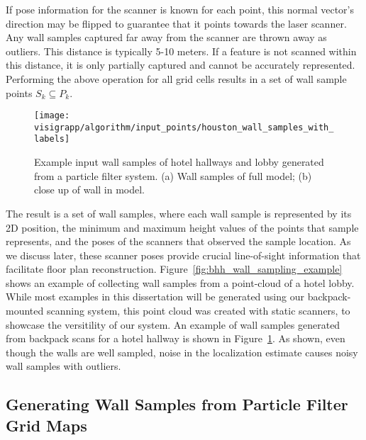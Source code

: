 \documentclass[12pt,onecolumn,oneside]{book}
\begin{document}
If pose information for the scanner is known for each point, this normal vector's direction may be flipped to guarantee that it points towards the laser scanner.  Any wall samples captured far away from the scanner are thrown away as outliers.  This distance is typically 5-10 meters.  If a feature is not scanned within this distance, it is only partially captured and cannot be accurately represented. Performing the above operation for all grid cells results in a set of wall sample points $S_k \subseteq P_k$.  

\begin{figure}
  \centering
  \texttt{[image: visigrapp/algorithm/input\_points/houston\_wall\_samples\_with\_labels]}
  \caption[Wall samples from backpack point cloud.]{Example input wall samples of hotel hallways and lobby generated from a particle filter system. (a) Wall samples of full model; (b) close up of wall in model.}
  \label{fig:backpack_wall_sample_example}
\end{figure}

The result is a set of wall samples, where each wall sample is represented by its 2D position, the minimum and maximum height values of the points that sample represents, and the poses of the scanners that observed the sample location.  As we discuss later, these scanner poses provide crucial line-of-sight information that facilitate floor plan reconstruction.  Figure~\ref{fig:bhh_wall_sampling_example} shows an example of collecting wall samples from a point-cloud of a hotel lobby.  While most examples in this dissertation will be generated using our backpack-mounted scanning system, this point cloud was created with static scanners, to showcase the versitility of our system. An example of wall samples generated from backpack scans for a hotel hallway is shown in Figure~\ref{fig:backpack_wall_sample_example}.  As shown, even though the walls are well sampled, noise in the localization estimate causes noisy wall samples with outliers.

\subsection{Generating Wall Samples from Particle Filter Grid Maps}
\label{ssec:ws_from_pf}
\end{document}
